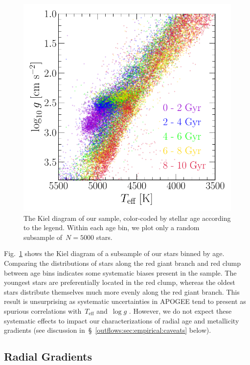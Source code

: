 \begin{figure}
\centering
\includegraphics[scale = 0.6]{kiel_diagram.pdf}
\caption{
The Kiel diagram of our sample, color-coded by stellar age according to the
legend.
Within each age bin, we plot only a random subsample of~$N = 5000$ stars.
}
\label{outflows:fig:kiel-diagram}
\end{figure}

Fig.~\ref{outflows:fig:kiel-diagram} shows the Kiel diagram of a subsample of
our stars binned by age.
Comparing the distributions of stars along the red giant branch and red clump
between age bins indicates some systematic biases present in the sample.
The youngest stars are preferentially located in the red clump, whereas the
oldest stars distribute themselves much more evenly along the red giant branch.
This result is unsurprising as systematic uncertainties in APOGEE tend to
present as spurious correlations with~$T_\text{eff}$ and~$\log g$
\citep[e.g.,][]{Joensson2018, Eilers2022}.
However, we do not expect these systematic effects to impact our
characterizations of radial age and metallicity gradients (see discussion
in~\S~\ref{outflows:sec:empirical:caveats} below).

\subsection{Radial Gradients}
\label{outflows:sec:empirical:gradients}

